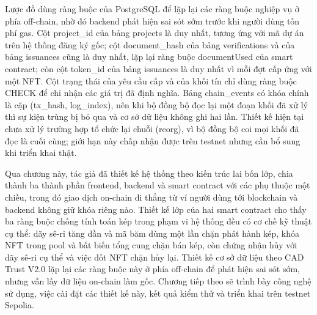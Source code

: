 \HinhERD

Lược đồ dùng ràng buộc của PostgreSQL để lặp lại các ràng buộc nghiệp vụ ở phía off-chain, nhờ đó backend phát hiện sai sót sớm trước khi người dùng tốn phí gas. Cột project\_id của bảng projects là duy nhất, tương ứng với mã dự án trên hệ thống đăng ký gốc; cột document\_hash của bảng verifications và của bảng issuances cũng là duy nhất, lặp lại ràng buộc documentUsed của smart contract; còn cột token\_id của bảng issuances là duy nhất vì mỗi đợt cấp ứng với một NFT. Cột trạng thái của yêu cầu cấp và của khối tín chỉ dùng ràng buộc CHECK để chỉ nhận các giá trị đã định nghĩa. Bảng chain\_events có khóa chính là cặp (tx\_hash, log\_index), nên khi bộ đồng bộ đọc lại một đoạn khối đã xử lý thì sự kiện trùng bị bỏ qua và cơ sở dữ liệu không ghi hai lần. Thiết kế hiện tại chưa xử lý trường hợp tổ chức lại chuỗi (reorg), vì bộ đồng bộ coi mọi khối đã đọc là cuối cùng; giới hạn này chấp nhận được trên testnet nhưng cần bổ sung khi triển khai thật.

Qua chương này, tác giả đã thiết kế hệ thống theo kiến trúc lai bốn lớp, chia thành ba thành phần frontend, backend và smart contract với các phụ thuộc một chiều, trong đó giao dịch on-chain đi thẳng từ ví người dùng tới blockchain và backend không giữ khóa riêng nào. Thiết kế lớp của hai smart contract cho thấy ba ràng buộc chống tính toán kép trong phạm vi hệ thống đều có cơ chế kỹ thuật cụ thể: dãy sê-ri tăng dần và mã băm dùng một lần chặn phát hành kép, khóa NFT trong pool và bất biến tổng cung chặn bán kép, còn chứng nhận hủy với dãy sê-ri cụ thể và việc đốt NFT chặn hủy lại. Thiết kế cơ sở dữ liệu theo CAD Trust V2.0 lặp lại các ràng buộc này ở phía off-chain để phát hiện sai sót sớm, nhưng vẫn lấy dữ liệu on-chain làm gốc. Chương tiếp theo sẽ trình bày công nghệ sử dụng, việc cài đặt các thiết kế này, kết quả kiểm thử và triển khai trên testnet Sepolia.
